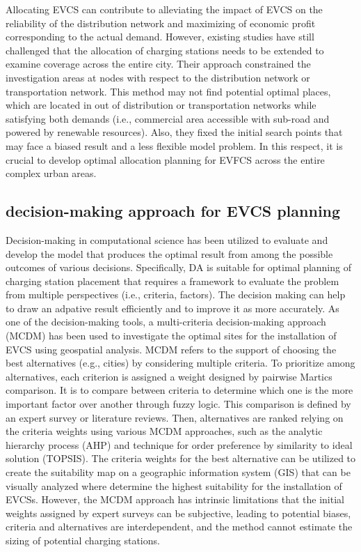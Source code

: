 \documentclass[preprint,12pt]{elsarticle}
\begin{document}
Allocating EVCS can contribute to alleviating the impact of EVCS on the reliability of the distribution network and maximizing of economic profit corresponding to the actual demand. However, existing studies have still challenged that the allocation of charging stations needs to be extended to examine coverage across the entire city. Their approach constrained the investigation areas at nodes with respect to the distribution network or transportation network. This method may not find potential optimal places, which are located in out of distribution or transportation networks while satisfying both demands (i.e., commercial area accessible with sub-road and powered by renewable resources). Also, they fixed the initial search points that may face a biased result and a less flexible model problem. In this respect, it is crucial to develop optimal allocation planning for EVFCS across the entire complex urban areas. 

\vspace{0.5cm}

\subsection{decision-making approach for EVCS planning}
Decision-making in computational science has been utilized to evaluate and develop the model that produces the optimal result from among the possible outcomes of various decisions. Specifically, DA is suitable for optimal planning of charging station placement that requires a framework to evaluate the problem from multiple perspectives (i.e., criteria, factors). The decision making can help to draw an adpative result efficiently and to improve it as more accurately. As one of the decision-making tools, a multi-criteria decision-making approach (MCDM) has been used to investigate the optimal sites for the installation of EVCS using geospatial analysis. MCDM refers to the support of choosing the best alternatives (e.g., cities) by considering multiple criteria. To prioritize among alternatives, each criterion is assigned a weight designed by pairwise Martics comparison. It is to compare between criteria to determine which one is the more important factor over another through fuzzy logic. This comparison is defined by an expert survey or literature reviews. Then, alternatives are ranked relying on the criteria weights using various MCDM approaches, such as the analytic hierarchy process (AHP) and technique for order preference by similarity to ideal solution (TOPSIS). The criteria weights for the best alternative can be utilized to create the suitability map on a geographic information system (GIS) that can be visually analyzed where determine the highest suitability for the installation of EVCSs. However, the MCDM approach has intrinsic limitations that the initial weights assigned by expert surveys can be subjective, leading to potential biases, criteria and alternatives are interdependent, and the method cannot estimate the sizing of potential charging stations.
\end{document}
